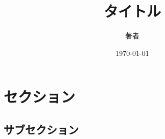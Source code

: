 \documentclass[a4j, 10pt]{jarticle}
\title{タイトル}
\author{著者}
\date{\today}
\begin{document}
  \maketitle
  \section{セクション}
  \subsection{サブセクション}
\end{document}

